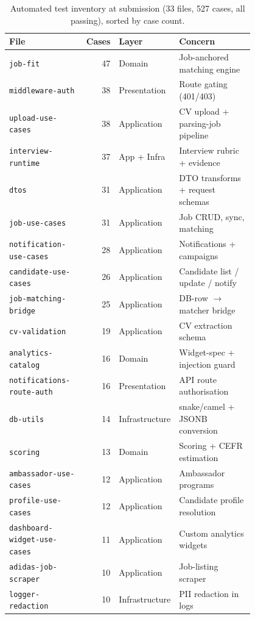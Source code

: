 \begin{table}[H]
\centering
\caption[Automated test inventory]{Automated test inventory at submission
(33 files, 527 cases, all passing), sorted by case count.}
\label{tab:test-inventory}
\footnotesize
\begin{tabular}{p{0.32\linewidth}r p{0.16\linewidth}p{0.32\linewidth}}
\toprule
\textbf{File} & \textbf{Cases} & \textbf{Layer} & \textbf{Concern} \\
\midrule
\texttt{job-fit} & 47 & Domain & Job-anchored matching engine \\
\texttt{middleware-auth} & 38 & Presentation & Route gating (401/403) \\
\texttt{upload-use-cases} & 38 & Application & CV upload + parsing-job pipeline \\
\texttt{interview-runtime} & 37 & App + Infra & Interview rubric + evidence \\
\texttt{dtos} & 31 & Application & DTO transforms + request schemas \\
\texttt{job-use-cases} & 31 & Application & Job CRUD, sync, matching \\
\texttt{notification-use-cases} & 28 & Application & Notifications + campaigns \\
\texttt{candidate-use-cases} & 26 & Application & Candidate list / update / notify \\
\texttt{job-matching-bridge} & 25 & Application & DB-row $\rightarrow$ matcher bridge \\
\texttt{cv-validation} & 19 & Application & CV extraction schema \\
\texttt{analytics-catalog} & 16 & Domain & Widget-spec + injection guard \\
\texttt{notifications-route-auth} & 16 & Presentation & API route authorisation \\
\texttt{db-utils} & 14 & Infrastructure & snake/camel + JSONB conversion \\
\texttt{scoring} & 13 & Domain & Scoring + CEFR estimation \\
\texttt{ambassador-use-cases} & 12 & Application & Ambassador programs \\
\texttt{profile-use-cases} & 12 & Application & Candidate profile resolution \\
\texttt{dashboard-widget-use-cases} & 11 & Application & Custom analytics widgets \\
\texttt{adidas-job-scraper} & 10 & Application & Job-listing scraper \\
\texttt{logger-redaction} & 10 & Infrastructure & PII redaction in logs \\

\end{tabular}
\end{table}
